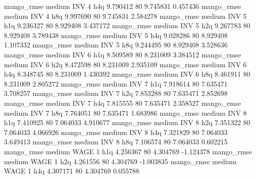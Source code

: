        mango_rmse     medium      INV                 4                  h4q  9.790412 80       9.745831           0.457436
       mango_rmse     medium      INV                 4                  h8q  9.997690 80       9.745831           2.584278
       mango_rmse     medium      INV                 5                  h1q  9.236327 80       8.929408           3.437172
       mango_rmse     medium      INV                 5                  h2q  9.267783 80       8.929408           3.789438
       mango_rmse     medium      INV                 5                  h4q  9.028286 80       8.929408           1.107332
       mango_rmse     medium      INV                 5                  h8q  9.244495 80       8.929408           3.528636
       mango_rmse     medium      INV                 6                  h1q  8.509589 80       8.231009           3.384512
       mango_rmse     medium      INV                 6                  h2q  8.472598 80       8.231009           2.935109
       mango_rmse     medium      INV                 6                  h4q  8.348745 80       8.231009           1.430392
       mango_rmse     medium      INV                 6                  h8q  8.461911 80       8.231009           2.805272
       mango_rmse     medium      INV                 7                  h1q  7.918614 80       7.635471           3.708257
       mango_rmse     medium      INV                 7                  h2q  7.853288 80       7.635471           2.852698
       mango_rmse     medium      INV                 7                  h4q  7.815555 80       7.635471           2.358527
       mango_rmse     medium      INV                 7                  h8q  7.764051 80       7.635471           1.683986
       mango_rmse     medium      INV                 8                  h1q  7.410925 80       7.064033           4.910677
       mango_rmse     medium      INV                 8                  h2q  7.351322 80       7.064033           4.066926
       mango_rmse     medium      INV                 8                  h4q  7.321829 80       7.064033           3.649413
       mango_rmse     medium      INV                 8                  h8q  7.106574 80       7.064033           0.602215
       mango_rmse     medium     WAGE                 1                  h1q  4.256367 80       4.304769          -1.124378
       mango_rmse     medium     WAGE                 1                  h2q  4.261556 80       4.304769          -1.003835
       mango_rmse     medium     WAGE                 1                  h4q  4.307171 80       4.304769           0.055788
